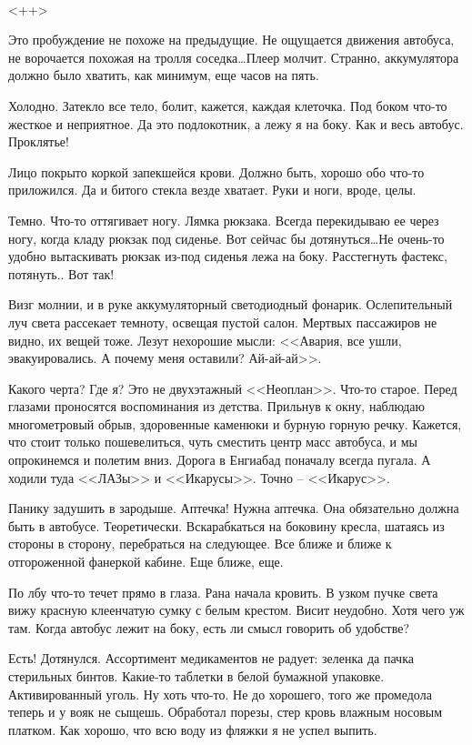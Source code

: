 \documentclass[a4paper]{book}
\begin{document}
\paragraph{}<++>

Это пробуждение не похоже на предыдущие. Не ощущается движения автобуса, не
ворочается похожая на тролля соседка\ldots Плеер молчит. Странно, аккумулятора должно было хватить, как минимум, еще часов на пять. 

Холодно. Затекло все тело, болит, кажется, каждая клеточка. Под боком что-то жесткое и неприятное. Да это подлокотник, а лежу я на боку. Как и весь автобус. Проклятье!

Лицо покрыто коркой запекшейся крови. Должно быть, хорошо обо что-то приложился. Да и битого стекла везде хватает. Руки и ноги, вроде, целы.

Темно. Что-то оттягивает ногу. Лямка рюкзака. Всегда перекидываю ее через ногу, когда кладу рюкзак под сиденье. Вот сейчас бы дотянуться\ldots Не очень-то удобно вытаскивать рюкзак из-под сиденья лежа на боку. Расстегнуть фастекс, потянуть.. Вот так!

Визг молнии, и в руке аккумуляторный светодиодный фонарик. Ослепительный луч света рассекает темноту, освещая пустой салон. Мертвых пассажиров не видно, их вещей тоже. Лезут нехорошие мысли: <<Авария, все ушли, эвакуировались. А почему меня оставили? Ай-ай-ай>>.

Какого черта? Где я? Это не двухэтажный <<Неоплан>>. Что-то старое. Перед глазами проносятся воспоминания из детства. Прильнув к окну, наблюдаю многометровый обрыв, здоровенные каменюки и бурную горную речку. Кажется, что стоит только пошевелиться, чуть сместить центр масс автобуса, и мы опрокинемся и полетим вниз. Дорога в Енгиабад поначалу всегда пугала. А ходили туда <<ЛАЗы>> и <<Икарусы>>. Точно -- <<Икарус>>.

Панику задушить в зародыше. Аптечка! Нужна аптечка. Она обязательно должна быть в автобусе. Теоретически. Вскарабкаться на боковину кресла, шатаясь из стороны в сторону, перебраться на следующее. Все ближе и ближе к отгороженной фанеркой кабине. Еще ближе, еще. 

По лбу что-то течет прямо в глаза. Рана начала кровить. В узком пучке света вижу красную клеенчатую сумку с белым крестом. Висит неудобно. Хотя чего уж там. Когда автобус лежит на боку, есть ли смысл говорить об удобстве? 

Есть! Дотянулся. Ассортимент медикаментов не радует: зеленка да пачка стерильных бинтов. Какие-то таблетки в белой бумажной упаковке. Активированный уголь. Ну хоть что-то. Не до хорошего, того же промедола теперь и у вояк не сыщешь. Обработал порезы, стер кровь влажным носовым платком. Как хорошо, что всю воду из фляжки я не успел выпить.
\end{document}
